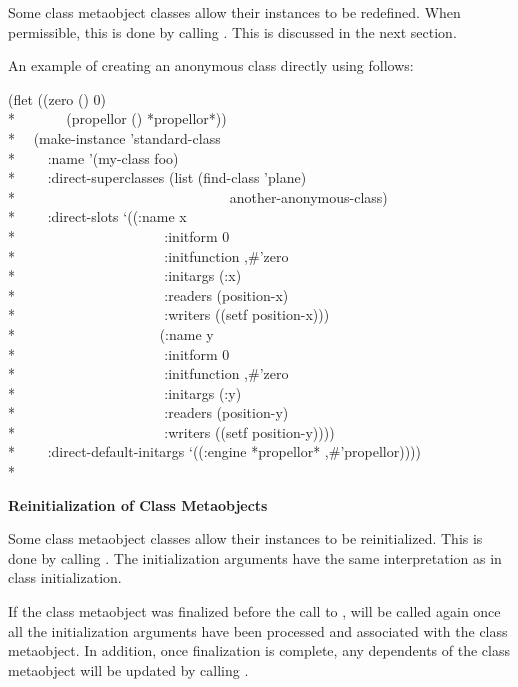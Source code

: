 Some class metaobject classes allow their instances to be redefined. When
permissible, this is done by calling . This is
discussed in the next section.

An example of creating an anonymous class directly using  follows:

\begin{lisp}
(flet ((zero () 0)\\*
~~~~~~ (propellor () *propellor*))\\*
~~(make-instance 'standard-class\\*
~~~~:name '(my-class foo)\\*
~~~~:direct-superclasses (list (find-class 'plane)\\*
~~~~~~~~~~~~~~~~~~~~~~~~~~~~~~another-anonymous-class)\\*
~~~~:direct-slots `((:name x\\*
~~~~~~~~~~~~~~~~~~~~ :initform 0\\*
~~~~~~~~~~~~~~~~~~~~ :initfunction ,\#'zero\\*
~~~~~~~~~~~~~~~~~~~~ :initargs (:x)\\*
~~~~~~~~~~~~~~~~~~~~ :readers (position-x)\\*
~~~~~~~~~~~~~~~~~~~~ :writers ((setf position-x)))\\*
~~~~~~~~~~~~~~~~~~~~(:name y\\*
~~~~~~~~~~~~~~~~~~~~ :initform 0\\*
~~~~~~~~~~~~~~~~~~~~ :initfunction ,\#'zero\\*
~~~~~~~~~~~~~~~~~~~~ :initargs (:y)\\*
~~~~~~~~~~~~~~~~~~~~ :readers (position-y)\\*
~~~~~~~~~~~~~~~~~~~~ :writers ((setf position-y))))\\*
~~~~:direct-default-initargs `((:engine *propellor* ,\#'propellor))))\\*
\end{lisp}
  
\textbf{Reinitialization of Class Metaobjects}

Some class metaobject classes allow their instances to be reinitialized. This is
done by calling . The initialization arguments have the
same interpretation as in class initialization. 

If the class metaobject was finalized before the call to ,
 will be called again once all the initialization arguments
have been processed and associated with the class metaobject. In addition, once
finalization is complete, any dependents of the class metaobject will be updated
by calling . 

